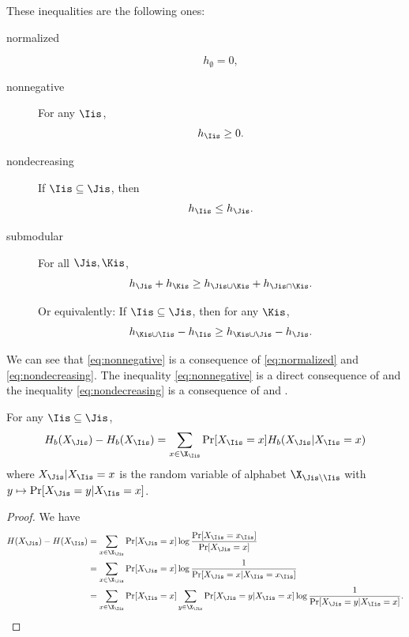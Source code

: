 \documentclass[11pt,twoside,a4paper,openright]{uclouvain-thesis}
\begin{document}
These inequalities are the following ones:
\begin{description}
  \item[normalized]
    \begin{equation}
      \label{eq:normalized}
      h_\emptyset = 0,
    \end{equation}
  \item[nonnegative]
    For any $\Iis$,
    \begin{equation}
      \label{eq:nonnegative}
      h_\Iis \geq 0.
    \end{equation}
  \item[nondecreasing]
    If $\Iis \subseteq \Jis$, then
    \begin{equation}
      \label{eq:nondecreasing}
      h_\Iis \leq h_\Jis.
    \end{equation}
  \item[submodular]
    For all $\Jis, \Kis$,
    \begin{equation}
      \label{eq:submodular1}
      h_\Jis + h_\Kis \geq h_{\Jis \cup \Kis} + h_{\Jis \cap \Kis}.
    \end{equation}

    Or equivalently:
    If $\Iis \subseteq \Jis$, then for any $\Kis$,
    \begin{equation}
      \label{eq:submodular2}
      h_{\Kis \cup \Iis} - h_{\Iis} \geq h_{\Kis \cup \Jis} - h_{\Jis}.
    \end{equation}
\end{description}

We can see that \eqref{eq:nonnegative} is a consequence of \eqref{eq:normalized} and \eqref{eq:nondecreasing}.
The inequality \eqref{eq:nonnegative} is a direct consequence of  and
the inequality \eqref{eq:nondecreasing} is a consequence of  and .

\begin{myprop}
  \label{prop:diffcond}
  For any $\Iis \subseteq \Jis$,
  \[ H_b(X_\Jis) - H_b(X_\Iis) = \sum_{x \in \X_\Iis} \Pr[X_\Iis=x] H_b(X_\Jis|X_\Iis=x) \]
  where $X_\Jis|X_\Iis=x$ is the random variable of alphabet $\X_{\Jis\setminus\Iis}$ with \pmf{} $y \mapsto \Pr[X_\Jis = y|X_\Iis=x]$.
  \begin{proof}
    We have
    \begin{align*}
      H(X_\Jis) - H(X_\Iis)
      & = \sum_{x \in \X_\Jis} \Pr[X_\Jis = x] \log \frac{\Pr[X_\Iis = x_\Iis]}{\Pr[X_\Jis = x]}\\
      & = \sum_{x \in \X_\Jis} \Pr[X_\Jis = x] \log \frac{1}{\Pr[X_\Jis = x|X_\Iis = x_\Iis]}\\
      & = \sum_{x \in \X_\Iis} \Pr[X_\Iis = x] \sum_{y \in \X_\Jis} \Pr[X_\Jis = y|X_\Iis = x] \log \frac{1}{\Pr[X_\Jis = y|X_\Iis = x]}.
    \end{align*}
  \end{proof}
\end{myprop}
\end{document}
